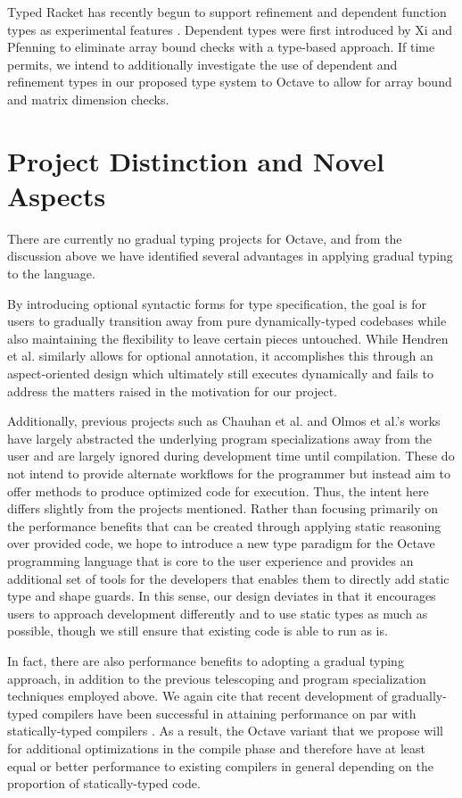Typed Racket has recently begun to support refinement and dependent function types as experimental features \cite{kent2017refinement}. Dependent types were first introduced by Xi and Pfenning \cite{xi1998eliminating} to eliminate array bound checks with a type-based approach. If time permits, we intend to additionally investigate the use of dependent and refinement types in our proposed type system to Octave to allow for array bound and matrix dimension checks.


\section{Project Distinction and Novel Aspects}
There are currently no gradual typing projects for Octave, and from the discussion above we have identified several advantages in applying gradual typing to the language.

By introducing optional syntactic forms for type specification, the goal is for users to gradually transition away from pure dynamically-typed codebases while also maintaining the flexibility to leave certain pieces untouched. While Hendren et al. \cite{hendren2011typing} similarly allows for optional annotation, it accomplishes this through an aspect-oriented design which ultimately still executes dynamically and fails to address the matters raised in the motivation for our project.

Additionally, previous projects such as Chauhan et al. \cite{chauhan2003type} and Olmos et al.’s \cite{olmos2003turning} works have largely abstracted the underlying program specializations away from the user and are largely ignored during development time until compilation. These do not intend to provide alternate workflows for the programmer but instead aim to offer methods to produce optimized code for execution. Thus, the intent here differs slightly from the projects mentioned. Rather than focusing primarily on the performance benefits that can be created through applying static reasoning over provided code, we hope to introduce a new type paradigm for the Octave programming language that is core to the user experience and provides an additional set of tools for the developers that enables them to directly add static type and shape guards. In this sense, our design deviates in that it encourages users to approach development differently and to use static types as much as possible, though we still ensure that existing code is able to run as is.

In fact, there are also performance benefits to adopting a gradual typing approach, in addition to the previous telescoping and program specialization techniques employed above. We again cite that recent development of gradually-typed compilers have been successful in attaining performance on par with statically-typed compilers \cite{kuhlenschmidt2018efficient}. As a result, the Octave variant that we propose will for additional optimizations in the compile phase and therefore have at least equal or better performance to existing compilers in general depending on the proportion of statically-typed code.

